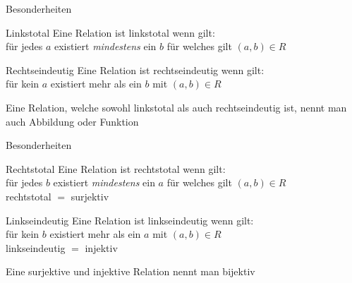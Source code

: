 \documentclass[18pt]{beamer}
\begin{document}
	\begin{frame}{Besonderheiten}
		\begin{block}{Linkstotal}
			Eine Relation ist linkstotal wenn gilt:\\
			f\"ur jedes $a$ existiert \textit{mindestens} ein $b$ f\"ur welches gilt $(a, b) \in R$
		\end{block}
		
		\pause

		\begin{block}{Rechtseindeutig}
			Eine Relation ist rechtseindeutig wenn gilt:\\
			f\"ur kein $a$ existiert mehr als ein $b$ mit $(a, b) \in R$
		\end{block}
		
		\pause

		\begin{block}{}
			Eine Relation, welche sowohl linkstotal als auch rechtseindeutig ist, nennt man auch Abbildung oder Funktion
		\end{block}
	\end{frame}



	\begin{frame}{Besonderheiten}
		\begin{block}{Rechtstotal}
			Eine Relation ist rechtstotal wenn gilt:\\
			f\"ur jedes $b$ existiert \textit{mindestens} ein $a$ f\"ur welches gilt $(a, b) \in R$\\
			rechtstotal $=$ surjektiv
		\end{block}
		
		\pause

		\begin{block}{Linkseindeutig}
			Eine Relation ist linkseindeutig wenn gilt:\\
			f\"ur kein $b$ existiert mehr als ein $a$ mit $(a, b) \in R$\\
			linkseindeutig $=$ injektiv
		\end{block}
		
		\pause

		\begin{block}{}
			Eine surjektive und injektive Relation nennt man bijektiv
		\end{block}
	\end{frame}
\end{document}
